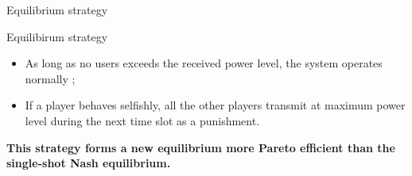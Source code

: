 \begin{frame}{Equilibrium strategy}
    \begin{block}{Equilibirum strategy}
        \begin{itemize}
            \item As long as no users exceeds the received power level, the system operates normally ;
            \item If a player behaves selfishly, all the other players transmit at maximum power level
            during the next time slot as a punishment.
        \end{itemize}
    \end{block}

    \vspace{0.5cm}
    \textbf{{\color{green}This strategy forms a new equilibrium more Pareto efficient than the
    single-shot Nash equilibrium.}}
\end{frame}
